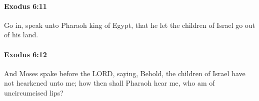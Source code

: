 		\paragraph{Exodus 6:11} %
			\label{EXODUS-6-11}

			Go in, speak unto Pharaoh king of Egypt, that he let the children of Israel go out of his land.


		\paragraph{Exodus 6:12} %
			\label{EXODUS-6-12}

			And Moses spake before the LORD, saying, Behold, the children of Israel have not hearkened unto me; how then shall Pharaoh hear me, who am of uncircumcised lips?



